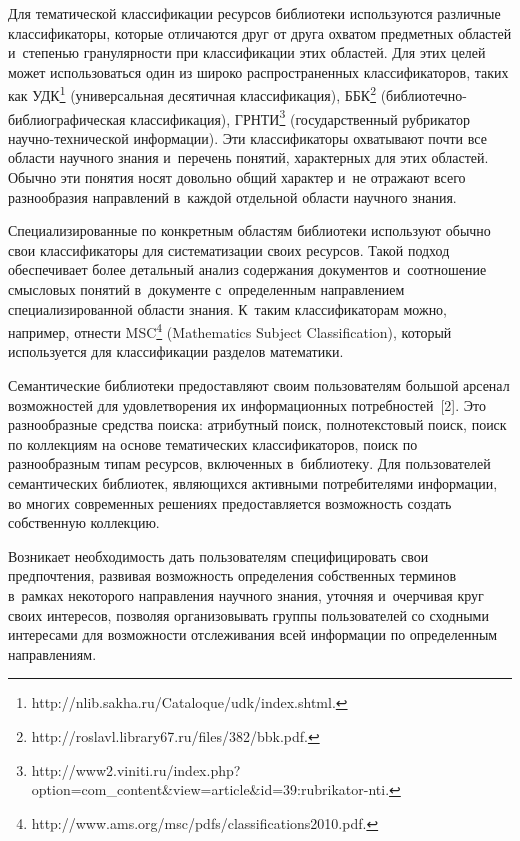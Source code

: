 \begin{multicols}{2}
Для тематической классификации ресурсов биб\-ли\-о\-те\-ки используются различные классификаторы, которые 
отличаются друг от друга охватом предметных областей и~степенью гранулярности при классификации этих 
областей. Для этих целей может использоваться один из широко распространенных классификаторов, таких 
как УДК\footnote[1]{{\sf http://nlib.sakha.ru/Cataloque/udk/index.shtml.}} (универсальная десятичная 
классификация), ББК\footnote[2]{{\sf http://roslavl.library67.ru/files/382/bbk.pdf.}} 
(биб\-лио\-теч\-но-биб\-лио\-гра\-фи\-че\-ская классификация), ГРНТИ\footnote[3]{{\sf 
http://www2.viniti.ru/index.php?option=com\_content\&view=article\&id=39:rubrikator-nti.}} 
(государственный рубрикатор на\-уч\-но-тех\-ни\-че\-ской информации). Эти классификаторы охватывают 
почти все области научного знания и~перечень понятий, характерных для этих областей. Обычно эти понятия 
носят довольно общий характер и~не отражают всего разнообразия направлений в~каждой отдельной 
области научного знания.
     
     Специализированные по конкретным областям библиотеки используют 
обычно свои классификаторы для систематизации своих ресурсов. Такой 
подход обеспечивает более детальный анализ содержания документов 
и~соотношение смысловых понятий в~документе с~определенным 
направлением специализированной области знания. К~таким 
классификаторам можно, например, отнести MSC\footnote[4]{{\sf 
http://www.ams.org/msc/pdfs/classifications2010.pdf.}} (Mathematics Subject 
Classification), который используется для классификации разделов 
математики. 
     
     Семантические библиотеки предоставляют своим пользователям 
большой арсенал возможностей для удовлетворения их информационных 
потребностей~[2]. Это разнообразные средства поиска: атрибутный поиск, 
полнотекстовый поиск, поиск по коллекциям на основе тематических 
классификаторов, поиск по разнообразным типам ресурсов, включенных 
в~библиотеку. Для пользователей семантических библиотек, являющихся 
активными потребителями информации, во многих современных решениях 
предоставляется возможность создать собственную коллекцию. 
     
     Возникает необходимость дать пользователям специфицировать свои 
предпочтения, развивая возможность определения собственных терминов 
в~рамках некоторого направления научного знания, уточняя и~очерчивая круг 
своих интересов, позволяя организовывать группы пользователей со 
сходными интересами для возможности отслеживания всей информации по 
определенным направлениям.
     

\end{multicols}
